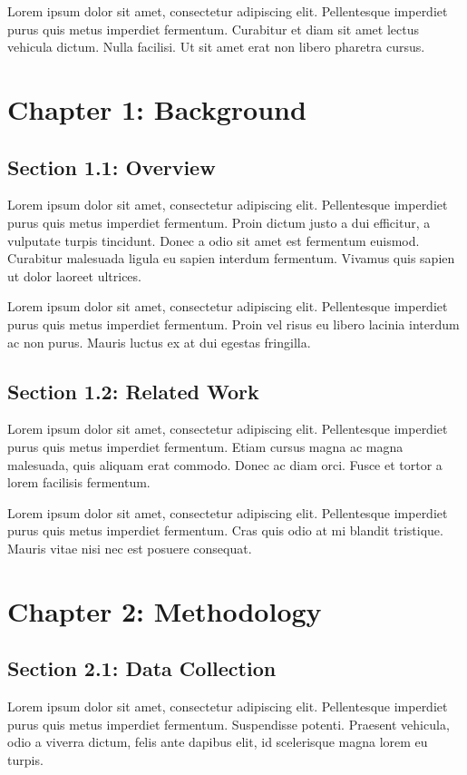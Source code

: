 \documentclass[a4paper, 12pt]{article}
\begin{document}
Lorem ipsum dolor sit amet, consectetur adipiscing elit. Pellentesque imperdiet purus quis metus imperdiet fermentum. Curabitur et diam sit amet lectus vehicula dictum. Nulla facilisi. Ut sit amet erat non libero pharetra cursus.

\newpage

\section{Chapter 1: Background}
\subsection{Section 1.1: Overview}
Lorem ipsum dolor sit amet, consectetur adipiscing elit. Pellentesque imperdiet purus quis metus imperdiet fermentum. Proin dictum justo a dui efficitur, a vulputate turpis tincidunt. Donec a odio sit amet est fermentum euismod. Curabitur malesuada ligula eu sapien interdum fermentum. Vivamus quis sapien ut dolor laoreet ultrices.

Lorem ipsum dolor sit amet, consectetur adipiscing elit. Pellentesque imperdiet purus quis metus imperdiet fermentum. Proin vel risus eu libero lacinia interdum ac non purus. Mauris luctus ex at dui egestas fringilla.

\subsection{Section 1.2: Related Work}
Lorem ipsum dolor sit amet, consectetur adipiscing elit. Pellentesque imperdiet purus quis metus imperdiet fermentum. Etiam cursus magna ac magna malesuada, quis aliquam erat commodo. Donec ac diam orci. Fusce et tortor a lorem facilisis fermentum.

Lorem ipsum dolor sit amet, consectetur adipiscing elit. Pellentesque imperdiet purus quis metus imperdiet fermentum. Cras quis odio at mi blandit tristique. Mauris vitae nisi nec est posuere consequat.

\newpage

\section{Chapter 2: Methodology}
\subsection{Section 2.1: Data Collection}
Lorem ipsum dolor sit amet, consectetur adipiscing elit. Pellentesque imperdiet purus quis metus imperdiet fermentum. Suspendisse potenti. Praesent vehicula, odio a viverra dictum, felis ante dapibus elit, id scelerisque magna lorem eu turpis.
\end{document}

